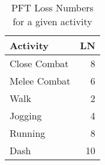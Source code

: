 \begin{table}[h]
\centering
\caption{PFT Loss Numbers for a given activity}
	\begin{tabular}{lr} \hline
	Activity		&	LN	\\ \hline	
	Close Combat	&	8	\\
	Melee Combat	&	6	\\
	Walk			&	2	\\
	Jogging			&	4	\\
	Running			&	8	\\
	Dash			&	10	\\ \hline
	\end{tabular}
\end{table}
